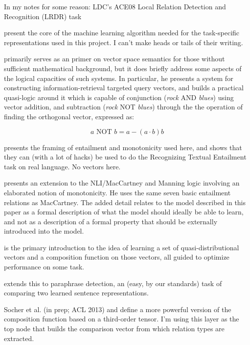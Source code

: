 \documentclass[10pt,letterpaper]{article}
\begin{document}
In my notes for some reason: LDC's ACE08 Local Relation Detection and Recognition (LRDR) task

 present the core of the machine learning algorithm needed for the task-specific representations used in this project. I can't make heads or tails of their writing.

 primarily serves as an primer on vector space semantics for those without sufficient mathematical background, but it does briefly address some aspects of the logical capacities of such systems. In particular, he presents a system for constructing information-retrieval targeted query vectors, and builds a practical quasi-logic around it which is capable of conjunction (\textit{rock} AND \textit{blues}) using vector addition, and subtraction (\textit{rock} NOT \textit{blues}) through the the operation of finding the orthogonal vector, expressed as:

\begin{equation}
a \text{~NOT~} b = a - (a \cdot b)b
\end{equation}

 \cite{maccartney2009natural}  presents the framing of entailment and monotonicity used here, and shows that they can (with a lot of hacks) be used to do the Recognizing Textual Entailment task on real language. No vectors here.

 presents an extension to the NLI/MacCartney and Manning logic involving an elaborated notion of monotonicity. He uses the same seven basic entailment relations as MacCartney. The added detail relates to the model described in this paper as a formal description of what the model should ideally be able to learn, and not as a description of a formal property that should be externally introduced into the model.

 is the primary introduction to the idea of learning a set of quasi-distributional vectors and a composition function on those vectors, all guided to optimize performance on some task.

 extends this to paraphrase detection, an (easy, by our standards) task of comparing two learned sentence representations.

Socher et al. (in prep; ACL 2013) and  define a more powerful version of the composition function based on a third-order tensor. I'm using this layer as the top node that builds the comparison vector from which relation types are extracted.
\end{document}
